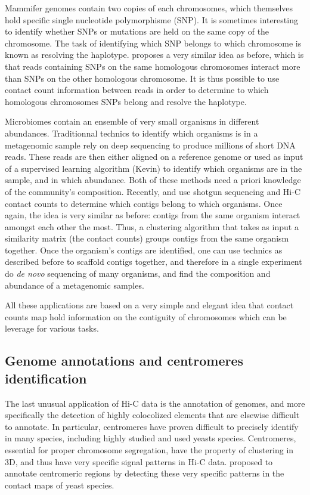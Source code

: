 Mammifer genomes contain two copies of each chromosomes, which themselves hold
specific single nucleotide polymorphisme (SNP). It is sometimes interesting to
identify whether SNPs or mutations are held on the same copy of the
chromosome. The task of identifying which SNP belongs to which chromosome is
known as resolving the haplotype. \citet{selvaraj:whole-genome}
proposes a very similar idea as
before, which is that reads containing SNPs on the same homologous chromosomes
interact more than SNPs on the other homologous chromosome. It is thus
possible to use contact count information between reads in order to determine
to which homologous chromosomes SNPs belong and resolve the haplotype.

Microbiomes contain an ensemble of very small organisms in different
abundances. Traditionnal technics to identify which organisms is in a
metagenomic sample rely on deep sequencing to produce millions of short DNA
reads. These reads are then either aligned on a reference genome or used as
input of a supervised learning algorithm (Kevin) to identify which organisms
are in the sample, and in which abundance. Both of these
methods need a priori knowledge of the community's composition. Recently,
\citet{burton:species-level} and \citet{marbouty:metagenomic} use shotgun
sequencing and Hi-C contact counts to determine which contigs belong to which
organisms. Once again, the idea is very similar as before: contigs from the
same organism interact amongst each other the most. Thus, a clustering
algorithm that takes as input a similarity matrix (the contact counts) groups
contigs from the same organism together. Once the organism's contigs are
identified, one can use technics as described before to scaffold contigs
together, and therefore in a single experiment do \textit{de novo} sequencing
of many organisms, and find the composition and abundance of a metagenomic
samples.

All these applications are based on a very simple and elegant idea that
contact counts map hold information on the contiguity of chromosomes which can
be leverage for various tasks.

\subsection{Genome annotations and centromeres identification}

The last unusual application of Hi-C data is the annotation of genomes, and
more specifically the detection of highly colocolized elements that are
elsewise difficult to annotate. In particular, centromeres have proven
difficult to precisely identify in many species, including highly studied and
used yeasts species. Centromeres, essential for proper chromosome segregation,
have the property of clustering in 3D, and thus have very specific signal
patterns in Hi-C data. \citet{marie-nelly:filling} proposed to annotate
centromeric regions by detecting these very specific patterns in the contact
maps of yeast species.

